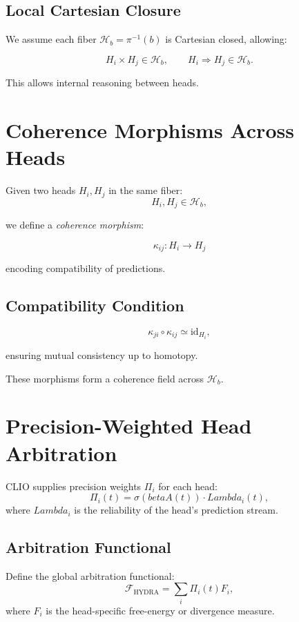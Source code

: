 \documentclass[12pt,oneside]{book}
\theoremstyle{plain}
\theoremstyle{definition}
\def\beta{beta}%
\def\Lambda{Lambda}%
\begin{document}
\subsection{Local Cartesian Closure}

We assume each fiber $\mathcal{H}_b = \pi^{-1}(b)$ is Cartesian closed,
allowing:

\[
H_i \times H_j \in \mathcal{H}_b,
\qquad
H_i \Rightarrow H_j \in \mathcal{H}_b.
\]

This allows internal reasoning between heads.

\section{Coherence Morphisms Across Heads}

Given two heads $H_i, H_j$ in the same fiber:
\[
H_i, H_j \in \mathcal{H}_b,
\]

we define a \emph{coherence morphism}:

\[
\kappa_{ij} : H_i \to H_j
\]

encoding compatibility of predictions.

\subsection{Compatibility Condition}

\[
\kappa_{ji} \circ \kappa_{ij} \simeq \mathrm{id}_{H_i},
\]

ensuring mutual consistency up to homotopy.

These morphisms form a coherence field across $\mathcal{H}_b$.

\section{Precision-Weighted Head Arbitration}

CLIO supplies precision weights $\Pi_i$ for each head:
\[
\Pi_i(t) = \sigma(\beta A(t)) \cdot \Lambda_i(t),
\]
where $\Lambda_i$ is the reliability of the head’s prediction stream.

\subsection{Arbitration Functional}

Define the global arbitration functional:
\begin{equation}
\label{eq:HYDRA_arbitration}
\mathcal{F}_{\mathrm{HYDRA}}
=
\sum_i
\Pi_i(t)
F_i,
\end{equation}
where $F_i$ is the head-specific free-energy or divergence measure.
\end{document}
